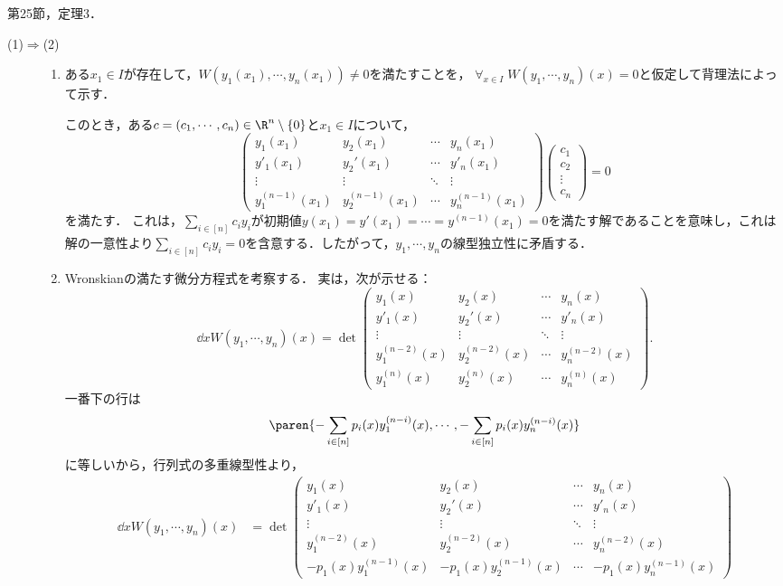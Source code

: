 \documentclass[uplatex,dvipdfmx]{jsreport}
\begin{document}
\begin{Proof}\cite{吉田耕作-微分方程式}第25節，定理3．
    \begin{description}
        \item[(1)$\Rightarrow$(2)] \begin{enumerate}[{Step}1]
            \item ある$x_1\in I$が存在して，$W(y_1(x_1),\cdots,y_n(x_1))\ne0$を満たすことを，
            $\forall_{x\in I}\;W(y_1,\cdots,y_n)(x)=0$と仮定して背理法によって示す．

            このとき，ある$c=(c_1,\cdots,c_n)\in\R^n\setminus\{0\}$と$x_1\in I$について，
            \[\begin{pmatrix}y_1(x_1)&y_2(x_1)&\cdots&y_n(x_1)\\y'_1(x_1)&y_2'(x_1)&\cdots&y'_n(x_1)\\\vdots&\vdots&\ddots&\vdots\\y_1^{(n-1)}(x_1)&y_2^{(n-1)}(x_1)&\cdots&y^{(n-1)}_n(x_1)\end{pmatrix}\begin{pmatrix}c_1\\c_2\\\vdots\\c_n\end{pmatrix}=0\]
            を満たす．
            これは，$\sum_{i\in[n]}c_iy_i$が初期値$y(x_1)=y'(x_1)=\cdots=y^{(n-1)}(x_1)=0$を満たす解であることを意味し，これは
            解の一意性より$\sum_{i\in[n]}c_iy_i=0$を含意する．したがって，$y_1,\cdots,y_n$の線型独立性に矛盾する．
            \item Wronskianの満たす微分方程式を考察する．
            実は，次が示せる：
            \[\dd{}{x}W(y_1,\cdots,y_n)(x)=\det\begin{pmatrix}y_1(x)&y_2(x)&\cdots&y_n(x)\\y'_1(x)&y_2'(x)&\cdots&y'_n(x)\\\vdots&\vdots&\ddots&\vdots\\y_1^{(n-2)}(x)&y_2^{(n-2)}(x)&\cdots&y^{(n-2)}_n(x)\\y_1^{(n)}(x)&y_2^{(n)}(x)&\cdots&y^{(n)}_n(x)\end{pmatrix}.\]
            一番下の行は
            \[\paren{-\sum_{i\in[n]}p_i(x)y_1^{(n-i)}(x),\cdots,-\sum_{i\in[n]}p_i(x)y_n^{(n-i)}(x)}\]
            に等しいから，行列式の多重線型性より，
            \begin{align*}
                \dd{}{x}W(y_1,\cdots,y_n)(x)&=\det\begin{pmatrix}y_1(x)&y_2(x)&\cdots&y_n(x)\\y'_1(x)&y_2'(x)&\cdots&y'_n(x)\\\vdots&\vdots&\ddots&\vdots\\y_1^{(n-2)}(x)&y_2^{(n-2)}(x)&\cdots&y^{(n-2)}_n(x)\\-p_1(x)y_1^{(n-1)}(x)&-p_1(x)y_2^{(n-1)}(x)&\cdots&-p_1(x)y_n^{(n-1)}(x)\end{pmatrix}\\

\end{align*}
\end{enumerate}
\end{description}
\end{Proof}
\end{document}
